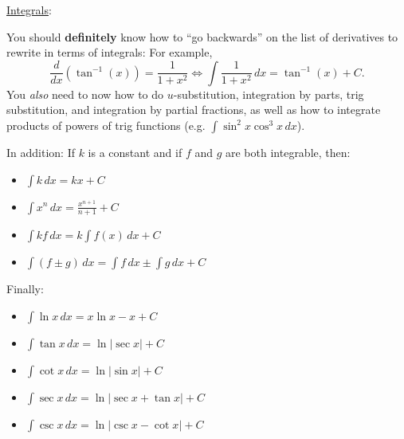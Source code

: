 \documentclass[12pt]{article}
\newcommand{\subsecnoindent}[2]{\vspace{3mm}\noindent\ul{#1}:\\[3mm]{#2}}
\begin{document}
	\subsecnoindent{Integrals}
	{
		You should \textbf{definitely} know how to ``go backwards'' on the list of derivatives to rewrite in terms of integrals: For example, 
		$$\displaystyle\frac{d}{dx}(\tan^{-1}(x))=\frac{1}{1+x^2}\Longleftrightarrow\int\frac{1}{1+x^2}\,dx=\tan^{-1}(x)+C.$$
		You \textit{also} need to now how to do $u$-substitution, integration by parts, trig substitution, and integration by partial fractions, as well as how to integrate products of powers of trig functions (e.g. $\int\sin^2{x}\cos^3{x}\,dx$).\vspace{3mm}
		
		\noindent In addition: If $k$ is a constant and if $f$ and $g$ are both integrable, then:
		\begin{multicols}{2}
			\begin{itemize}[leftmargin=0.375in,itemsep=0.0625in,label=$\circ$]
				\item $\int k\,dx=kx + C$
				\item $\int x^n\,dx=\frac{x^{n+1}}{n+1}+C$
				\item $\int kf\,dx=k\int f(x)\,dx + C$
				\item $\int (f\pm g)\,dx=\int f\,dx\pm \int g\,dx + C$
			\end{itemize}
		\end{multicols}
		
		\noindent Finally:
		\begin{multicols}{2}
			\begin{itemize}[leftmargin=0.375in,itemsep=0.0625in,label=$\circ$]
				\item $\int \ln{x}\,dx=x\ln{x}-x+C$
				\item $\int \tan{x}\,dx=\ln|\sec{x}|+C$
				\item $\int \cot{x}\,dx=\ln|\sin{x}|+C$
				\item $\int \sec{x}\,dx=\ln|\sec{x}+\tan{x}|+C$
				\item $\int \csc{x}\,dx=\ln|\csc{x}-\cot{x}|+C$
			\end{itemize}
		\end{multicols}
	}
\end{document}
